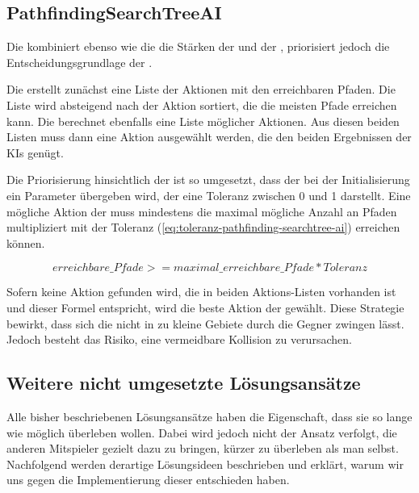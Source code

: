 \subsection{PathfindingSearchTreeAI}
\label{subsec:pathfinding-searchtree-ai}

Die  kombiniert ebenso wie die  die Stärken der
 und der , priorisiert jedoch die Entscheidungsgrundlage der
.

Die  erstellt zunächst eine Liste der Aktionen mit den erreichbaren Pfaden.
Die Liste wird absteigend nach der Aktion sortiert, die die meisten Pfade erreichen kann.
Die  berechnet ebenfalls eine Liste möglicher Aktionen.
Aus diesen beiden Listen muss dann eine Aktion ausgewählt werden, die den beiden Ergebnissen der \ac{KI}s genügt.

Die Priorisierung hinsichtlich der  ist so umgesetzt, dass der  bei
der Initialisierung ein Parameter übergeben wird, der eine Toleranz zwischen 0 und 1 darstellt.
Eine mögliche Aktion der  muss mindestens die maximal mögliche Anzahl an Pfaden multipliziert mit der
Toleranz (\ref{eq:toleranz-pathfinding-searchtree-ai}) erreichen können.

\begin{equation}
\label{eq:toleranz-pathfinding-searchtree-ai}
erreichbare\_Pfade >= maximal\_erreichbare\_Pfade * Toleranz
\end{equation}

Sofern keine Aktion gefunden wird, die in beiden Aktions-Listen vorhanden ist und dieser Formel entspricht, wird die
beste Aktion der  gewählt.
Diese Strategie bewirkt, dass sich die  nicht in zu kleine Gebiete durch die Gegner
zwingen lässt.
Jedoch besteht das Risiko, eine vermeidbare Kollision zu verursachen.

\subsection{Weitere nicht umgesetzte Lösungsansätze}
\label{subsec:weitere-loesungsansaetze}

Alle bisher beschriebenen Lösungsansätze haben die Eigenschaft, dass sie so lange wie möglich überleben wollen.
Dabei wird jedoch nicht der Ansatz verfolgt, die anderen Mitspieler gezielt dazu zu bringen, kürzer zu überleben als man
selbst.
Nachfolgend werden derartige Lösungsideen beschrieben und erklärt, warum wir uns gegen die Implementierung dieser
entschieden haben. \\

